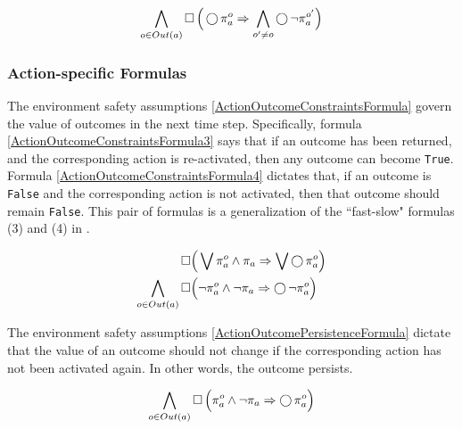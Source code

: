 \begin{equation}\label{OutcomeMutexFormula}
	\bigwedge \limits_{o \in Out(a)} \operatorname{\Box} \Big( \operatorname{\bigcirc} \pi_a^o \Rightarrow \bigwedge \limits_{o^\prime \neq o} \operatorname{\bigcirc} \lnot \pi_a^{o^\prime} \Big)
\end{equation}


\subsubsection{Action-specific Formulas}

The environment safety assumptions \eqref{ActionOutcomeConstraintsFormula} govern the value of outcomes in the next time step. 
Specifically, formula \eqref{ActionOutcomeConstraintsFormula3} says that if an outcome has been returned, and the corresponding action is re-activated, then any outcome can become \texttt{True}. 
Formula \eqref{ActionOutcomeConstraintsFormula4} dictates that, if an outcome is \texttt{False} and the corresponding action is not activated, then that outcome should remain \texttt{False}.
This pair of formulas is a generalization of the ``fast-slow" formulas (3) and (4) in \cite{Vasu2013ICRA}.

\begin{subequations}
	\label{ActionOutcomeConstraintsFormula}
	\begin{align}
		\operatorname{\Box}& \Big( \bigvee \pi_a^o \wedge \pi_a \Rightarrow \bigvee \operatorname{\bigcirc} \pi_a^o \Big)\label{ActionOutcomeConstraintsFormula3}\\
		\bigwedge \limits_{o \in Out(a)} \operatorname{\Box}& \Big( \lnot \pi_a^o \wedge \lnot \pi_a \Rightarrow \operatorname{\bigcirc} \lnot \pi_a^o \Big)\label{ActionOutcomeConstraintsFormula4}
	\end{align}
\end{subequations}

The environment safety assumptions \eqref{ActionOutcomePersistenceFormula} dictate that the value of an outcome should not change if the corresponding action has not been activated again. 
In other words, the outcome persists.

\begin{equation}\label{ActionOutcomePersistenceFormula}
	\bigwedge \limits_{o \in Out(a)} \operatorname{\Box} \Big( \pi_a^o \wedge \lnot \pi_a \Rightarrow \operatorname{\bigcirc} \pi_a^o \Big)
\end{equation}

